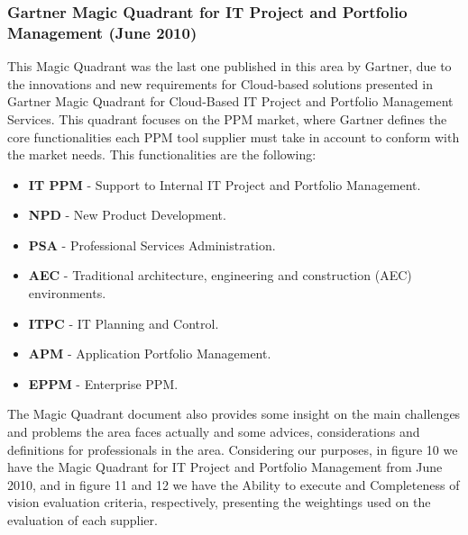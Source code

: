 \subsubsection{Gartner Magic Quadrant for IT Project and Portfolio Management (June 2010)}

This Magic Quadrant was the last one published in this area by Gartner, due to the innovations and new requirements for Cloud-based solutions presented in Gartner Magic Quadrant for Cloud-Based IT Project and Portfolio Management Services\cite{magicQuadrantCloud}.
This quadrant focuses on the PPM market, where Gartner defines the core functionalities each PPM tool supplier must take in account to conform with the market needs. This functionalities are the following:

\begin{itemize}
\item \textbf{IT PPM} - Support to Internal IT Project and Portfolio Management.
\item \textbf{NPD} - New Product Development.
\item \textbf{PSA} - Professional Services Administration.
\item \textbf{AEC} - Traditional architecture, engineering and construction (AEC) environments.
\item \textbf{ITPC} - IT Planning and Control.
\item \textbf{APM} - Application Portfolio Management.
\item \textbf{EPPM} - Enterprise PPM.
\end{itemize}

The Magic Quadrant document\cite{magicQuadrantPPM} also provides some insight on the main challenges and problems the area faces actually and some advices, considerations and definitions for professionals in the area. Considering our purposes, in figure 10 we have the Magic Quadrant for IT Project and Portfolio Management from June 2010, and in figure 11 and 12 we have the Ability to execute and Completeness of vision evaluation criteria, respectively, presenting the weightings used on the evaluation of each supplier.\par

